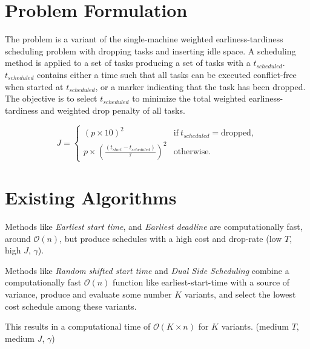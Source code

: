 \documentclass[journal,12pt,onecolumn,draftclsnofoot,]{IEEEtran}
\begin{document}
\section{Problem Formulation}

The problem is a variant of the single-machine weighted earliness-tardiness scheduling problem with dropping tasks and inserting idle space.
A scheduling method is applied to a set of tasks producing a set of tasks with a $t_{scheduled}$.
$t_{scheduled}$ contains either a time such that all tasks can be executed conflict-free when started at $t_{scheduled}$, or a marker indicating that the task has been dropped.
The objective is to select $t_{scheduled}$ to minimize the total weighted earliness-tardiness and weighted drop penalty of all tasks.

\begin{equation}
	J = \begin{cases}
		(p \times 10)^2                                       & \mathrm{if}~t_{scheduled} = \mathrm{dropped,} \\
		p \times (\frac{(t_{start} - t_{scheduled})}{\tau})^2 & \mathrm{otherwise.}
	\end{cases}
\end{equation}

\section{Existing Algorithms}

Methods like \emph{Earliest start time}, and \emph{Earliest deadline} are computationally fast, around $\mathcal{O}(n)$, but produce schedules with a high cost and drop-rate (low $T$, high $J$, $\gamma$).

Methods like \emph{Random shifted start time} and \emph{Dual Side Scheduling} combine a computationally fast
$\mathcal{O}(n)$ function like earliest-start-time with a source of variance, produce and evaluate some number $K$ variants, and select the lowest cost schedule among these variants.

This results in a computational time of $\mathcal{O}(K \times n)$ for $K$ variants. (medium $T$, medium $J$, $\gamma$)
\end{document}
